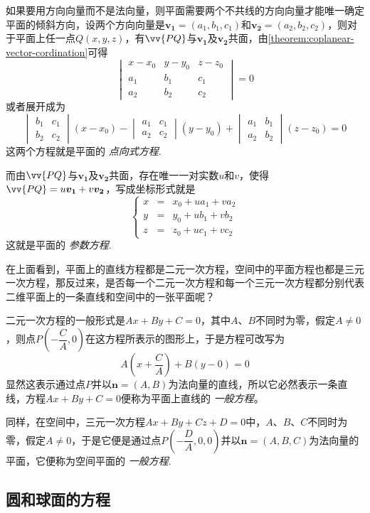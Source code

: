 如果要用方向向量而不是法向量，则平面需要两个不共线的方向向量才能唯一确定平面的倾斜方向，设两个方向向量是$\bm{v_1}=(a_1,b_1,c_1)$和$\bm{v_2}=(a_2,b_2,c_2)$，则对于平面上任一点$Q(x,y,z)$，有$\vv{PQ}$与$\bm{v_1}$及$\bm{v_2}$共面，由\autoref{theorem:coplanear-vector-cordination}可得
\[
  \begin{vmatrix}
    x-x_0 & y-y_0 & z-z_0 \\
    a_1 & b_1 & c_1 \\
    a_2 & b_2 & c_2
  \end{vmatrix}
  =0
\]
或者展开成为
\[
  \begin{vmatrix}
    b_1 & c_1 \\
    b_2 & c_2
  \end{vmatrix}
  (x-x_0) -
  \begin{vmatrix}
    a_1 & c_1 \\
    a_2 & c_2
  \end{vmatrix}
  (y-y_0) +
  \begin{vmatrix}
    a_1 & b_1 \\
    a_2 & b_2
  \end{vmatrix}
  (z-z_0) = 0
\]
这两个方程就是平面的 \emph{点向式方程}.

而由$\vv{PQ}$与$\bm{v_1}$及$\bm{v_2}$共面，存在唯一一对实数$u$和$v$，使得$\vv{PQ}=u \bm{v_1} + v \bm{v_2}$，写成坐标形式就是
\[
  \left\{
    \begin{array}{lll}
      x & = & x_0 + u a_1 + v a_2 \\
      y & = & y_0 + u b_1 + v b_2 \\
      z & = & z_0 + u c_1 + v c_2
    \end{array}
    \right.
\]
这就是平面的 \emph{参数方程}.

在上面看到，平面上的直线方程都是二元一次方程，空间中的平面方程也都是三元一次方程，那反过来，是否每一个二元一次方程和每一个三元一次方程都分别代表二维平面上的一条直线和空间中的一张平面呢？

二元一次方程的一般形式是$Ax+By+C=0$，其中$A$、$B$不同时为零，假定$A \neq 0$，则点$P(-\dfrac{C}{A},0)$在这方程所表示的图形上，于是方程可改写为
\[ A(x+\frac{C}{A})+B(y-0)=0 \]
显然这表示通过点$P$并以$\bm{n}=(A,B)$为法向量的直线，所以它必然表示一条直线，方程$Ax+By+C=0$便称为平面上直线的 \emph{一般方程}。

同样，在空间中，三元一次方程$Ax+By+Cz+D=0$中，$A$、$B$、$C$不同时为零，假定$A \neq 0$，于是它便是通过点$P(-\dfrac{D}{A},0,0)$并以$\bm{n}=(A,B,C)$为法向量的平面，它便称为空间平面的 \emph{一般方程}.

\subsection{圆和球面的方程}
\label{sec:equation-of-circle-and-ball}

